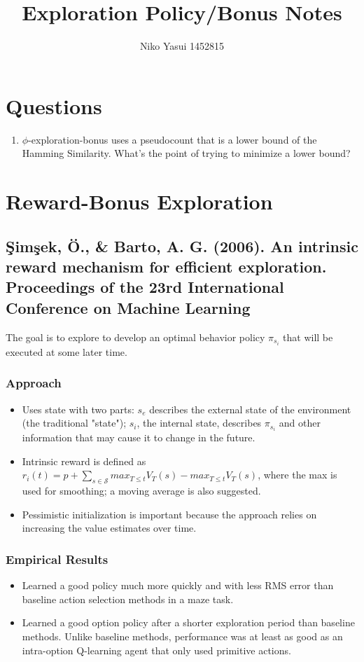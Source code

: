 \documentclass[12pt, oneside]{amsart}
\title{Exploration Policy/Bonus Notes}
\author{Niko Yasui 1452815}
\begin{document}
	
	\maketitle

\section*{Questions}
\begin{enumerate}
	\item $\phi$-exploration-bonus uses a pseudocount that is a lower bound of the Hamming Similarity. What's the point of trying to minimize a lower bound?
\end{enumerate}

\section*{Reward-Bonus Exploration}

\subsection*{\c{S}im\c{s}ek, \"{O}., \& Barto, A. G. (2006). An intrinsic reward mechanism for efficient exploration. Proceedings of the 23rd International Conference on Machine Learning}
The goal is to explore to develop an optimal behavior policy $\pi_{s_i}$ that will be executed at some later time.

\subsubsection*{Approach}
\begin{itemize}
	\item Uses state with two parts: $s_e$ describes the external state of the environment (the traditional "state"); $s_i$, the internal state, describes $\pi_{s_i}$ and other information that may cause it to change in the future.
	\item Intrinsic reward is defined as $r_i(t) = p + \sum_{s \in \mathcal{S}} max_{T \leq t}{V_T(s)} - max_{T \leq t} {V_T(s)}$, where the max is used for smoothing; a moving average is also suggested.
	\item Pessimistic initialization is important because the approach relies on increasing the value estimates over time.
\end{itemize}

\subsubsection*{Empirical Results}
\begin{itemize}
	\item Learned a good policy much more quickly and with less RMS error than baseline action selection methods in a maze task.
	\item Learned a good option policy after a shorter exploration period than baseline methods. Unlike baseline methods, performance was at least as good as an intra-option Q-learning agent that only used primitive actions.
\end{itemize}
\end{document}
